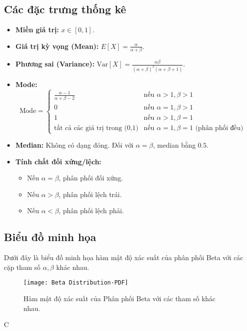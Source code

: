 	\subsection{Các đặc trưng thống kê}
	\begin{itemize}[leftmargin=*]
		\item \textbf{Miền giá trị:} $x \in [0, 1]$.
		\item \textbf{Giá trị kỳ vọng (Mean):} $E[X] = \frac{\alpha}{\alpha+\beta}$.
		\item \textbf{Phương sai (Variance):} $\text{Var}[X] = \frac{\alpha\beta}{(\alpha+\beta)^2(\alpha+\beta+1)}$.
		\item \textbf{Mode:}
		\[ \text{Mode} = \begin{cases} \frac{\alpha-1}{\alpha+\beta-2} & \text{nếu } \alpha > 1, \beta > 1 \\ 0 & \text{nếu } \alpha=1, \beta > 1 \\ 1 & \text{nếu } \alpha > 1, \beta=1 \\ \text{tất cả các giá trị trong (0,1)} & \text{nếu } \alpha=1, \beta=1 \text{ (phân phối đều)} \end{cases} \]
		\item \textbf{Median:} Không có dạng đóng. Đối với $\alpha = \beta$, median bằng $0.5$.
		\item \textbf{Tính chất đối xứng/lệch:}
		\begin{itemize}
			\item Nếu $\alpha = \beta$, phân phối đối xứng.
			\item Nếu $\alpha > \beta$, phân phối lệch trái.
			\item Nếu $\alpha < \beta$, phân phối lệch phải.
		\end{itemize}
	\end{itemize}
	
	\subsection{Biểu đồ minh họa}
	Dưới đây là biểu đồ minh họa hàm mật độ xác suất của phân phối Beta với các cặp tham số $\alpha, \beta$ khác nhau.
	
	\begin{figure}[h!]
		\centering
		\texttt{[image: Beta Distribution-PDF]} %
		\caption{Hàm mật độ xác suất của Phân phối Beta với các tham số khác nhau.}
		\label{fig:Beta Distribution-PDF}
	\end{figure}C
	
